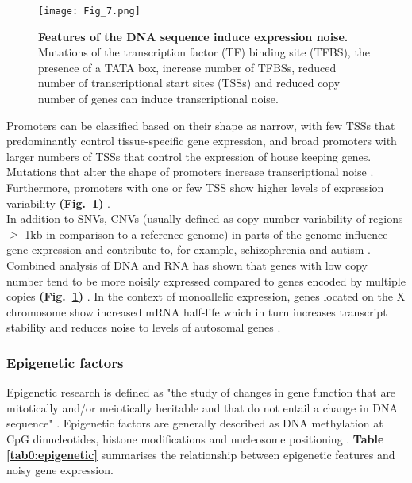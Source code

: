 \newpage

\begin{figure}[!h]
\centering
\texttt{[image: Fig\_7.png]}
\caption[Features of the DNA sequence induce expression noise]{\textbf{Features of the DNA sequence induce expression noise.}\\
Mutations of the transcription factor (TF) binding site (TFBS), the presence of a TATA box, increase number of TFBSs, reduced number of transcriptional start sites (TSSs) and reduced copy number of genes can induce transcriptional noise.}
\label{fig0:DNA_features}
\end{figure}

Promoters can be classified based on their shape as narrow, with few \glspl{TSS} that predominantly control tissue-specific gene expression, and broad promoters with larger numbers of TSSs that control the expression of house keeping genes. 
Mutations that alter the shape of promoters increase transcriptional noise \citep{Schor2017a}. 
Furthermore, promoters with one or few TSS show higher levels of expression variability \textbf{(Fig.~\ref{fig0:DNA_features})} \citep{Faure2017}.\\

In addition to \glspl{SNV}, \glspl{CNV} (usually defined as copy number variability of regions $\geq$ 1kb in comparison to a reference genome) in parts of the genome influence gene expression and contribute to, for example, schizophrenia and autism \citep{Gamazon2015}. 
Combined analysis of DNA and RNA has shown that genes with low copy number tend to be more noisily expressed compared to genes encoded by multiple copies \textbf{(Fig.~\ref{fig0:DNA_features})} \citep{Dey2015}. 
In the context of monoallelic expression, genes located on the X chromosome show increased mRNA half-life which in turn increases transcript stability and reduces noise to levels of autosomal genes \citep{Faure2017}.

\subsubsection{Epigenetic factors}
\label{sec0:epigenetic}

Epigenetic research is defined as "the study of changes in gene function that are mitotically and/or meiotically heritable and that do not entail a change in DNA sequence" \citep{Wu2001}. 
Epigenetic factors are generally described as DNA methylation at \gls{CpG} dinucleotides, histone modifications and nucleosome positioning  \citep{Portela2010}. 
\textbf{Table \ref{tab0:epigenetic}} summarises the relationship between epigenetic features and noisy gene expression. \\

